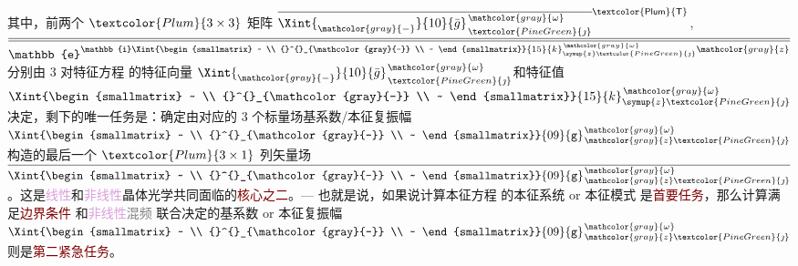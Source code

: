 其中，前两个 $\textcolor{Plum}{3 \times 3}$ 矩阵 $\overline{\Xint{{}^{}_{\mathcolor{gray}{-}}}{10}{\bar{g}}^{\;\!\mathcolor{gray}{\omega}}_{\;\! \textcolor{PineGreen}{\jmath}}}^{\mathsf{\textcolor{Plum}{T}}}$, $\overline{\overline{\mathbb{e}^{\mathbb{i} \Xint{\begin{smallmatrix} ~ \\ {}^{}_{\mathcolor{gray}{-}} \\ ~ \end{smallmatrix}}{15}{k}_{\symup{z} \textcolor{PineGreen}{\jmath}}^{\;\! \mathcolor{gray}{\omega}} \mathcolor{gray}{z}}}}$ 分别由 3 对\textcolor{PineGreen}{特征方程}  的\textcolor{PineGreen}{特征向量} $\Xint{{}^{}_{\mathcolor{gray}{-}}}{10}{\bar{g}}^{\;\!\mathcolor{gray}{\omega}}_{\;\! \textcolor{PineGreen}{\jmath}}$和\textcolor{PineGreen}{特征值}$\Xint{\begin{smallmatrix} ~ \\ {}^{}_{\mathcolor{gray}{-}} \\ ~ \end{smallmatrix}}{15}{k}_{\symup{z} \textcolor{PineGreen}{\jmath}}^{\;\! \mathcolor{gray}{\omega}}$决定，剩下的唯一任务是：确定由对应的 3 个标量场\textcolor{PineGreen}{基系数}/\textcolor{PineGreen}{本征复振幅} $\Xint{\begin{smallmatrix} ~ \\ {}^{}_{\mathcolor{gray}{-}} \\ ~ \end{smallmatrix}}{09}{\mathtt{g}}^{\;\!\mathcolor{gray}{\omega}}_{\;\! \mathcolor{gray}{z} \textcolor{PineGreen}{\jmath}}$ 构造的最后一个 $\textcolor{Plum}{3 \times 1}$ 列矢量场 $\overline{\Xint{\begin{smallmatrix} ~ \\ {}^{}_{\mathcolor{gray}{-}} \\ ~ \end{smallmatrix}}{09}{\mathtt{g}}^{\;\!\mathcolor{gray}{\omega}}_{\;\! \mathcolor{gray}{z} \textcolor{PineGreen}{\jmath}}}$。这是\textcolor{Plum}{线性}和\textcolor{Plum}{非线性}\textcolor{PineGreen}{晶体光学}共同面临的\textcolor{Maroon}{核心之二}。--- 也就是说，如果说计算\textcolor{PineGreen}{本征方程}  的\textcolor{PineGreen}{本征系统} or \textcolor{PineGreen}{本征模}式  是\textcolor{Maroon}{首要任务}，那么计算满足\textcolor{Maroon}{边界条件}  和\textcolor{Plum}{非线性}\textcolor{gray}{混频}  联合决定的\textcolor{PineGreen}{基系数} or \textcolor{PineGreen}{本征复振幅} $\Xint{\begin{smallmatrix} ~ \\ {}^{}_{\mathcolor{gray}{-}} \\ ~ \end{smallmatrix}}{09}{\mathtt{g}}^{\;\!\mathcolor{gray}{\omega}}_{\;\! \mathcolor{gray}{z} \textcolor{PineGreen}{\jmath}}$ 则是\textcolor{Maroon}{第二紧急任务}。

